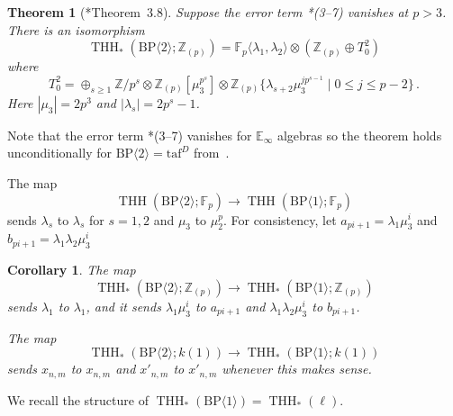 \documentclass[11pt]{amsart}
\newcommand{\mr}[1]{\mathrm{#1}}
\newcommand{\taf}{\mathrm{taf}}
\newcommand{\BP}{\mr{BP}}
\DeclareMathOperator{\THH}{THH}
\newtheorem{theorem}[equation]{Theorem}
\newtheorem{corollary}[equation]{Corollary}
\theoremstyle{definition}
\numberwithin{equation}{section}
\numberwithin{figure}{section}
\begin{document}
\begin{theorem}[{\cite{ACH24}*{Theorem~3.8}}]\label{thm:BP2-coeff}
Suppose the error term \cite{ACH24}*{(3--7)} vanishes at $p>3$. There is an isomorphism 
\[ 
\THH_*(\BP\langle 2\rangle ;\mathbb{Z}_{(p)})=\mathbb{F}_p\langle \lambda_1 ,\lambda_2\rangle \otimes \left ( \mathbb{Z}_{(p)}\oplus T_0^2 \right )
\]
where 
\[ T_0^2 = \oplus_{s\ge 1} \mathbb{Z}/p^s\otimes \mathbb{Z}_{(p)}[\mu_3^{p^s}]\otimes \mathbb{Z}_{(p)}\{\lambda_{s+2}\mu_3^{jp^{s-1}} \mid 0\le j\le p-2 \} \,. 
\]
%
%
%
%
%
%
%
%
%
Here $|\mu_3|=2p^3$ and $|\lambda_{s}|=2p^{s}-1$. 
\end{theorem}
Note that the error term \cite{ACH24}*{(3--7)} vanishes for $\mathbb{E}_\infty$ algebras so the theorem holds unconditionally for $\BP\langle 2\rangle=\taf^{D}$ from~\cite{HL10}. 

The map 
\[ 
  \THH(\BP\langle 2\rangle ; \mathbb{F}_p)\to  \THH(\BP\langle 1\rangle ; \mathbb{F}_p) 
\]
sends $\lambda_s$ to $\lambda_s$ for $s=1,2$ and $\mu_3$ to $\mu_2^p$. For consistency, let $a_{pi+1}=\lambda_1\mu_3^{i}$ and $b_{pi+1}=\lambda_1\lambda_2\mu_3^{i}$ 

\begin{corollary}
  The map 
  \[ 
    \THH_*(\BP\langle 2\rangle ;\mathbb{Z}_{(p)})\longrightarrow \THH_*(\BP\langle 1\rangle ;\mathbb{Z}_{(p)})
  \]
  sends $\lambda_1$ to $\lambda_1$, and it sends $\lambda_1\mu_3^i$ to $a_{pi+1}$ and $\lambda_1\lambda_2\mu_3^i$ to $b_{pi+1}$. 

  The map 
  \[ 
    \THH_*(\BP\langle 2\rangle ;k(1))\longrightarrow \THH_*(\BP\langle 1\rangle ;k(1))
  \]
  sends $x_{n,m}$ to $x_{n,m}$ and $x'_{n,m}$ to $x'_{n,m}$ whenever this makes sense.
\end{corollary}



We recall the structure of $\THH_*(\BP \langle 1 \rangle) = \THH_*(\ell)$.
\end{document}
